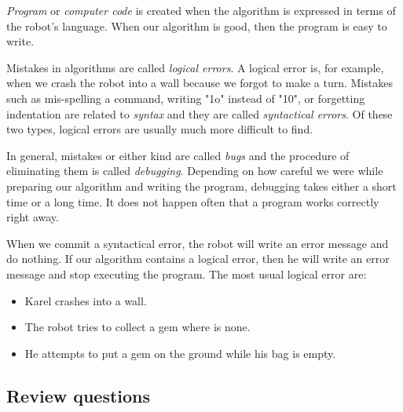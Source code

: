 \documentclass[article,A4,12pt]{llncs}
\begin{document}
{{{\em Program} or {\em computer code} is created when the algorithm is expressed
in terms of the robot's language. When our algorithm is good, then 
the program is easy to write.

Mistakes in algorithms are called {\em logical errors}. A logical error is, for 
example, when we crash the robot into a wall because we forgot to make a turn.
Mistakes such as mis-spelling a command, writing "1o" instead of "10", or forgetting 
indentation are related to 
{\em syntax} and they are called {\em syntactical errors}. Of these two types, 
logical errors are usually much more difficult to find. 

In general, mistakes or either kind are called {\em bugs} and the procedure of 
eliminating them is called {\em debugging}. Depending on how careful we 
were while preparing our algorithm and writing the program, debugging takes either 
a short time or a long time. It does not happen often that a program works correctly
right away. 

When we commit a syntactical error,
the robot will write an error message and do nothing.
If our algorithm contains a logical error, then he will
write an error message and stop executing the program. 
The most usual logical error are:

\begin{itemize}
\item Karel crashes into a wall.
\item The robot tries to collect a gem where is none.
\item He attempts to put a gem on the ground while his bag is empty.
\end{itemize}

\subsection{Review questions} 

}}
\end{document}
